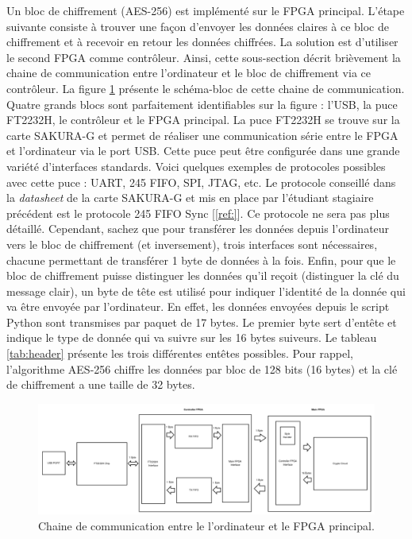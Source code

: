 \documentclass[oneside]{book}
\begin{document}
Un bloc de chiffrement (AES-256) est implémenté sur le FPGA principal. L'étape suivante consiste à trouver une façon d'envoyer les données claires à ce bloc de chiffrement et à recevoir en retour les données chiffrées. La solution est d'utiliser le second FPGA comme contrôleur. Ainsi, cette sous-section décrit brièvement la chaine de communication entre l'ordinateur et le bloc de chiffrement via ce contrôleur. La figure \ref{fig:FPGA_Controler} présente le schéma-bloc de cette chaine de communication. Quatre grands blocs sont parfaitement identifiables sur la figure : l'USB, la puce FT2232H, le contrôleur et le FPGA principal. La puce FT2232H se trouve sur la carte SAKURA-G et permet de réaliser une communication série entre le FPGA et l'ordinateur via le port USB. Cette puce peut être configurée dans une grande variété d'interfaces standards. Voici quelques exemples de protocoles possibles avec cette puce : UART, 245 FIFO, SPI, JTAG, etc. Le protocole conseillé dans la \textit{datasheet} de la carte SAKURA-G et mis en place par l'étudiant stagiaire précédent est le protocole 245 FIFO Sync [\ref{ref:}]. Ce protocole ne sera pas plus détaillé. Cependant, sachez que pour transférer les données depuis l'ordinateur vers le bloc de chiffrement (et inversement), trois interfaces sont nécessaires, chacune permettant de transférer 1 byte de données à la fois. Enfin, pour que le bloc de chiffrement puisse distinguer les données qu'il reçoit (distinguer la clé du message clair), un byte de tête est utilisé pour indiquer l'identité de la donnée qui va être envoyée par l'ordinateur. En effet, les données envoyées depuis le script Python sont transmises par paquet de 17 bytes. Le premier byte sert d'entête et indique le type de donnée qui va suivre sur les 16 bytes suiveurs. Le tableau \ref{tab:header} présente les trois différentes entêtes possibles. Pour rappel, l'algorithme AES-256 chiffre les données par bloc de 128 bits (16 bytes) et la clé de chiffrement a une taille de 32 bytes.

\begin{figure}[htbp]
    \hspace{-2cm}
    \includegraphics[scale=0.56]{image/FPGA_Controler}
    \caption{Chaine de communication entre le l'ordinateur et le FPGA principal.}
    \label{fig:FPGA_Controler} 
\end{figure}
\end{document}
